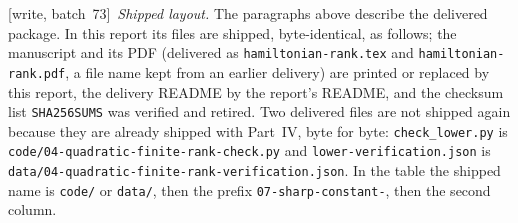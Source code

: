 \documentclass[11pt,letterpaper]{article}
\theoremstyle{definition}
\theoremstyle{remark}
\newcommand{\wsevthree}{\textup{[write, batch~73]}}
\begin{document}
\wsevthree\ \emph{Shipped layout.} The paragraphs above describe the delivered
package. In this report its files are shipped, byte-identical, as follows;
the manuscript and its PDF (delivered as \texttt{hamiltonian-rank.tex} and
\texttt{hamiltonian-rank.pdf}, a file name kept from an earlier delivery) are
printed or replaced by this report, the delivery README by the report's
README, and the checksum list \texttt{SHA256SUMS} was verified and retired.
Two delivered files are not shipped again because they are already shipped
with Part~IV, byte for byte: \texttt{check\_lower.py} is
\nolinkurl{code/04-quadratic-finite-rank-check.py} and
\texttt{lower-verification.json} is
\nolinkurl{data/04-quadratic-finite-rank-verification.json}.
In the table the shipped name is
\texttt{code/} or \texttt{data/}, then the prefix
\nolinkurl{07-sharp-constant-}, then the second column.
\end{document}
